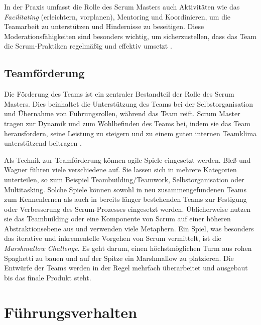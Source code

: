 \documentclass[5pt, final]{beamer}
\begin{document}
\begin{frame}[t]
\begin{multicols}{3}
			In der Praxis umfasst die Rolle des Scrum Masters auch Aktivitäten wie das \textit{Facilitating} (erleichtern, vorplanen), Mentoring und Koordinieren, um die Teamarbeit zu unterstützen und Hindernisse zu beseitigen.
            Diese Moderationsfähigkeiten sind besonders wichtig, um sicherzustellen, dass das Team die Scrum-Praktiken regelmäßig und effektiv umsetzt \cite{Shastri21}.
			
			\subsection{Teamförderung}
			
			Die Förderung des Teams ist ein zentraler Bestandteil der Rolle des Scrum Masters.
            Dies beinhaltet die Unterstützung des Teams bei der Selbstorganisation und Übernahme von Führungsrollen, während das Team reift. Scrum Master tragen zur Dynamik und zum Wohlbefinden des Teams bei, indem sie das Team herausfordern, seine Leistung zu steigern und zu einem guten internen Teamklima unterstützend beitragen \cite{Spiegler21}.
            
            Als Technik zur Teamförderung können agile Spiele eingesetzt werden.
            Bleß und Wagner \cite{bless24} führen viele verschiedene auf.
            Sie lassen sich in mehrere Kategorien unterteilen, so zum Beispiel Teambuilding/Teamwork, Selbstorganisation oder Multitasking.
            Solche Spiele können sowohl in neu zusammengefundenen Teams zum Kennenlernen als auch in bereits länger bestehenden Teams zur Festigung oder Verbesserung des Scrum-Prozesses eingesetzt werden.
            Üblicherweise nutzen sie das Teambuilding oder eine Komponente von Scrum auf einer höheren Abstraktionsebene aus und verwenden viele Metaphern.
            Ein Spiel, was besonders das iterative und inkrementelle Vorgehen von Scrum vermittelt, ist die \textit{Marshmallow Challenge}.
            Es geht darum, einen höchstmöglichen Turm aus rohen Spaghetti zu bauen und auf der Spitze ein Marshmallow zu platzieren.
            Die Entwürfe der Teams werden in der Regel mehrfach überarbeitet und ausgebaut bis das finale Produkt steht.
			
			\section {Führungsverhalten}
            

\end{multicols}
\end{frame}
\end{document}
